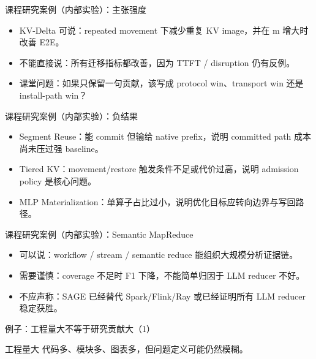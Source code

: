 \begin{frame}{课程研究案例（内部实验）：主张强度}
  \begin{itemize}
    \item KV-Delta 可说：repeated movement 下减少重复 KV image，并在 m 增大时改善 E2E。
    \item 不能直接说：所有迁移指标都改善，因为 TTFT / disruption 仍有反例。
    \item 课堂问题：如果只保留一句贡献，该写成 protocol win、transport win 还是 install-path win？
  \end{itemize}
  \InternalCaseNote
\end{frame}

\begin{frame}{课程研究案例（内部实验）：负结果}
  \begin{itemize}
    \item Segment Reuse：能 commit 但输给 native prefix，说明 committed path 成本尚未压过强 baseline。
    \item Tiered KV：movement/restore 触发条件不足或代价过高，说明 admission policy 是核心问题。
    \item MLP Materialization：单算子占比过小，说明优化目标应转向边界与写回路径。
  \end{itemize}
  \InternalCaseNote
\end{frame}

\begin{frame}{课程研究案例（内部实验）：Semantic MapReduce}
  \begin{itemize}
    \item 可以说：workflow / stream / semantic reduce 能组织大规模分析证据链。
    \item 需要谨慎：coverage 不足时 F1 下降，不能简单归因于 LLM reducer 不好。
    \item 不应声称：SAGE 已经替代 Spark/Flink/Ray 或已经证明所有 LLM reducer 稳定获胜。
  \end{itemize}
  \InternalCaseNote
\end{frame}

\begin{frame}{例子：工程量大不等于研究贡献大（1）}
\begin{block}{工程量大}
    代码多、模块多、图表多，但问题定义可能仍然模糊。
  \end{block}
\end{frame}

